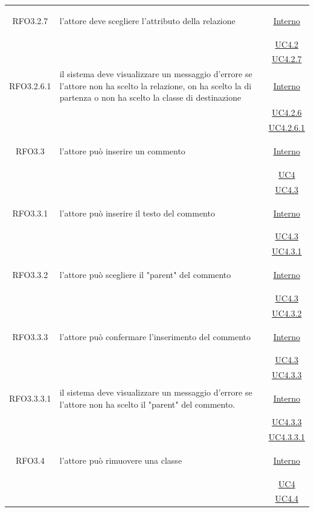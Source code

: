 \begin{itemize}
\begin{itemize}
\begin{itemize}
\begin{itemize}
\begin{longtable}{|c|>{\centering}m{7cm}|c|}
\hypertarget{RFO3.2.7}{RFO3.2.7} & l'attore deve scegliere l'attributo della relazione & \hyperlink{Interno}{Interno}\\
& &\hyperref[UC4.2]{UC4.2}\\
& &\hyperref[UC4.2.7]{UC4.2.7}\\ \hline

\hypertarget{RFO3.2.6.1}{RFO3.2.6.1} & il sistema deve visualizzare un messaggio d'errore se l'attore non ha scelto la relazione, on ha scelto la di partenza o non ha scelto la classe di destinazione &  \hyperlink{Interno}{Interno}\\
& &\hyperref[UC4.2.6]{UC4.2.6}\\
& &\hyperref[UC4.2.6.1]{UC4.2.6.1}\\ \hline

\hypertarget{RFO3.3}{RFO3.3} & l'attore può inserire un commento &  \hyperlink{Interno}{Interno}\\
& &\hyperref[UC4]{UC4}\\
& &\hyperref[UC4.3]{UC4.3}\\ \hline

\hypertarget{RFO3.3.1}{RFO3.3.1} & l'attore può inserire il testo del commento & \hyperlink{Interno}{Interno}\\
& &\hyperref[UC4.3]{UC4.3}\\
& &\hyperref[UC4.3.1]{UC4.3.1}\\ \hline

\hypertarget{RFO3.3.2}{RFO3.3.2} & l'attore può scegliere il "parent" del commento & \hyperlink{Interno}{Interno}\\
& &\hyperref[UC4.3]{UC4.3}\\
& &\hyperref[UC4.3.2]{UC4.3.2}\\ \hline

\hypertarget{RFO3.3.3}{RFO3.3.3} & l'attore può confermare l'inserimento del commento & \hyperlink{Interno}{Interno}\\
& &\hyperref[UC4.3]{UC4.3}\\
& &\hyperref[UC4.3.3]{UC4.3.3}\\ \hline

\hypertarget{RFO3.3.3.1}{RFO3.3.3.1} & il sistema deve visualizzare un messaggio d'errore se l'attore non ha scelto il "parent" del commento. & \hyperlink{Interno}{Interno}\\
& &\hyperref[UC4.3.3]{UC4.3.3}\\
& &\hyperref[UC4.3.3.1]{UC4.3.3.1}\\ \hline

\hypertarget{RFO3.4}{RFO3.4} & l'attore può rimuovere una classe &  \hyperlink{Interno}{Interno}\\
& &\hyperref[UC4]{UC4}\\
& &\hyperref[UC4.4]{UC4.4}\\ \hline


\end{longtable}
\end{itemize}
\end{itemize}
\end{itemize}
\end{itemize}
